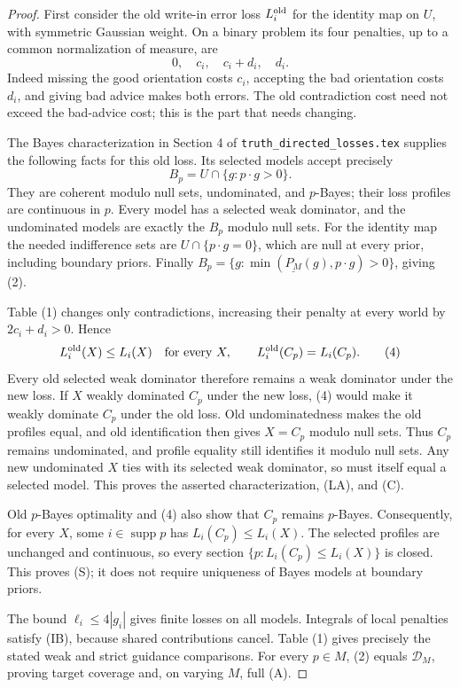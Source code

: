 \documentclass[11pt]{article}
\newcommand{\Dscr}{\mathcal D}
\newcommand{\supp}{\operatorname{supp}}
\begin{document}
\begin{proof}
First consider the old write-in error loss $L_i^{\rm old}$ for the
identity map on $U$, with symmetric Gaussian weight. On a binary problem
its four penalties, up to a common normalization of measure, are
\[
 0,\quad c_i,\quad c_i+d_i,\quad d_i.
\tag{3}
\]
Indeed missing the good orientation costs $c_i$, accepting the bad
orientation costs $d_i$, and giving bad advice makes both errors.
The old contradiction cost need not exceed the bad-advice cost; this is
the part that needs changing.

The Bayes characterization in Section 4 of
\texttt{truth\_directed\_losses.tex} supplies the
following facts for this old loss. Its selected models accept precisely
\[
 B_p=U\cap\{g:p\cdot g>0\}.
\]
They are coherent modulo null sets, undominated, and $p$-Bayes; their
loss profiles are continuous in $p$. Every model has a selected weak
dominator, and the undominated models are exactly the $B_p$ modulo
null sets. For the identity map the needed indifference sets are
$U\cap\{p\cdot g=0\}$, which are null at every prior, including boundary
priors. Finally
$B_p=\{g:\min(\underline{P_M}(g),p\cdot g)>0\}$, giving (2).

Table (1) changes only contradictions, increasing their penalty at every
world by $2c_i+d_i>0$. Hence
\[
 L_i^{\rm old}(X)\le L_i(X)\quad\text{for every }X,
 \qquad L_i^{\rm old}(C_p)=L_i(C_p).
\tag{4}
\]
Every old selected weak dominator therefore remains a weak dominator
under the new loss. If $X$ weakly dominated $C_p$ under the new loss,
(4) would make it weakly dominate $C_p$ under the old loss. Old
undominatedness makes the old profiles equal, and old identification
then gives $X=C_p$ modulo null sets. Thus $C_p$ remains undominated,
and profile equality still identifies it modulo null sets. Any new
undominated $X$ ties with its selected weak dominator, so must itself
equal a selected model. This proves the asserted characterization,
(LA), and (C).

Old $p$-Bayes optimality and (4) also show that $C_p$ remains $p$-Bayes.
Consequently, for every $X$, some $i\in\supp p$ has $L_i(C_p)\le L_i(X)$.
The selected profiles are unchanged and continuous, so every section
$\{p:L_i(C_p)\le L_i(X)\}$ is closed. This proves (S); it does not
require uniqueness of Bayes models at boundary priors.

The bound $\ell_i\le4|g_i|$ gives finite losses on all models.
Integrals of local penalties satisfy (IB), because shared contributions
cancel. Table (1) gives precisely the stated weak and strict guidance
comparisons. For every $p\in M$, (2) equals $\Dscr_M$, proving target
coverage and, on varying $M$, full (A).
\end{proof}
\end{document}
